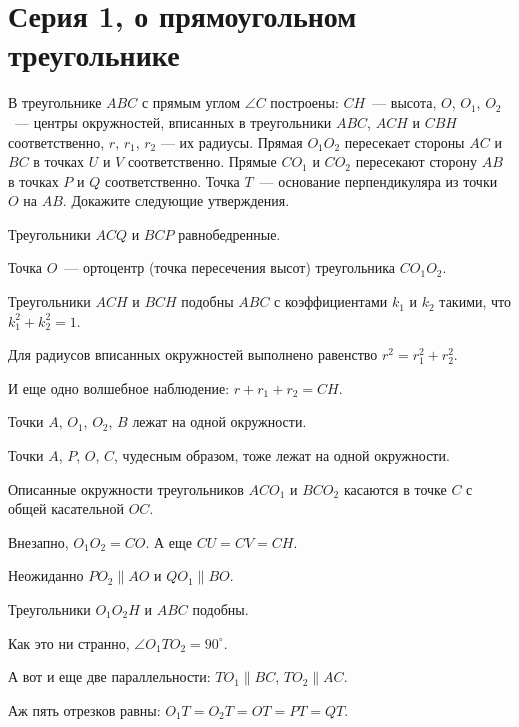

\section*{Серия 1, о прямоугольном треугольнике}


В треугольнике $ABC$ с прямым углом $\angle C$ построены:
$CH$~--- высота,
$O$, $O_1$, $O_2$~--- центры окружностей, вписанных в треугольники
$ABC$, $ACH$ и $CBH$ соответственно,
$r$, $r_1$, $r_2$ --- их радиусы.
Прямая $O_1 O_2$ пересекает стороны $AC$ и $BC$ в точках $U$ и $V$
соответственно.
Прямые $C O_1$ и $C O_2$ пересекают сторону $AB$ в точках $P$ и $Q$
соответственно.
Точка $T$~--- основание перпендикуляра из точки $O$ на $AB$.
Докажите следующие утверждения.

\begin{problems}

\item
Треугольники $ACQ$ и $BCP$ равнобедренные.

\item
Точка $O$~--- ортоцентр (точка пересечения высот) треугольника $C O_1 O_2$.

\item
Треугольники $ACH$ и $BCH$ подобны $ABC$ с коэффициентами $k_1$ и $k_2$ такими,
что $k_1^2 + k_2^2 = 1$.

\item
Для радиусов вписанных окружностей выполнено равенство $r^2 = r_1^2 + r_2^2$.

\item
И еще одно волшебное наблюдение: $r + r_1 + r_2 = CH$.

\item
Точки $A$, $O_1$, $O_2$, $B$ лежат на одной окружности.

\item
Точки $A$, $P$, $O$, $C$, чудесным образом, тоже лежат на одной окружности.

\item
Описанные окружности треугольников $A C O_1$ и $B C O_2$ касаются в точке $C$
с общей касательной $OC$.

\item
Внезапно, $O_1 O_2 = C O$.
\qquad
\problem
А еще $CU = CV = CH$.

\item
Неожиданно $P O_2 \parallel A O$ и $Q O_1 \parallel B O$.
\qquad
\item
Треугольники $O_1 O_2 H$ и $ABC$ подобны.

\item
Как это ни странно, $\angle O_1 T O_2 = 90^\circ$.

\item
А вот и еще две параллельности: $T O_1 \parallel B C$, $T O_2 \parallel A C$.

\item
Аж пять отрезков равны: $O_1 T = O_2 T = O T = P T = Q T$.

\end{problems}


